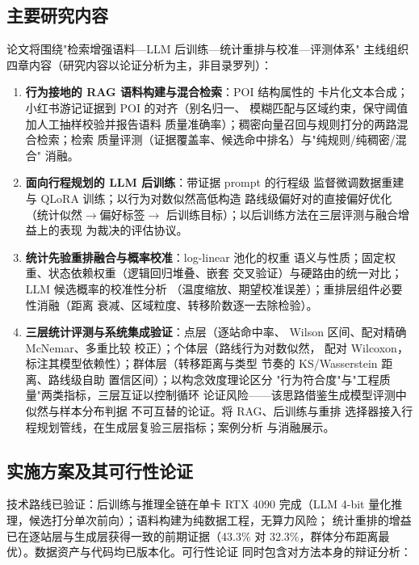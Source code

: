 \subsection{主要研究内容}

论文将围绕"检索增强语料—LLM 后训练—统计重排与校准—评测体系"
主线组织四章内容（研究内容以论证分析为主，非目录罗列）：

\begin{enumerate}
  \item \textbf{行为接地的 RAG 语料构建与混合检索}：POI 结构属性的
        卡片化文本合成；小红书游记证据到 POI 的对齐（别名归一、
        模糊匹配与区域约束，保守阈值加人工抽样校验并报告语料
        质量准确率）；稠密向量召回与规则打分的两路混合检索；检索
        质量评测（证据覆盖率、候选命中排名）与"纯规则/纯稠密/混合"
        消融。
  \item \textbf{面向行程规划的 LLM 后训练}：带证据 prompt 的行程级
        监督微调数据重建与 QLoRA 训练；以行为对数似然高低构造
        路线级偏好对的直接偏好优化（统计似然$\to$偏好标签$\to$
        后训练目标）；以后训练方法在三层评测与融合增益上的表现
        为裁决的评估协议。
  \item \textbf{统计先验重排融合与概率校准}：log-linear 池化的权重
        语义与性质；固定权重、状态依赖权重（逻辑回归堆叠、嵌套
        交叉验证）与硬路由的统一对比；LLM 候选概率的校准性分析
        （温度缩放、期望校准误差）；重排层组件必要性消融（距离
        衰减、区域粒度、转移阶数逐一去除检验）。
  \item \textbf{三层统计评测与系统集成验证}：点层（逐站命中率、
        Wilson 区间\cite{wilson1927probable}、配对精确
        McNemar\cite{mcnemar1947note}、多重比较
        校正\cite{holm1979simple}）；个体层（路线行为对数似然，
        配对 Wilcoxon，标注其模型依赖性）；群体层（转移距离与类型
        节奏的 KS/Wasserstein 距离\cite{massey1951ks}、路线级自助
        置信区间）；以构念效度理论\cite{cronbach1955construct}区分
        "行为符合度"与"工程质量"两类指标，三层互证以控制循环
        论证风险——该思路借鉴生成模型评测中似然与样本分布判据
        不可互替的论证\cite{theis2016note}。将 RAG、后训练与重排
        选择器接入行程规划管线，在生成层复验三层指标；案例分析
        与消融展示。
\end{enumerate}

\subsection{实施方案及其可行性论证}

技术路线已验证：后训练与推理全链在单卡 RTX 4090 完成（LLM 4-bit
量化推理，候选打分单次前向）；语料构建为纯数据工程，无算力风险；
统计重排的增益已在逐站层与生成层获得一致的前期证据（43.3\% 对
32.3\%，群体分布距离最优）。数据资产与代码均已版本化。可行性论证
同时包含对方法本身的辩证分析：

